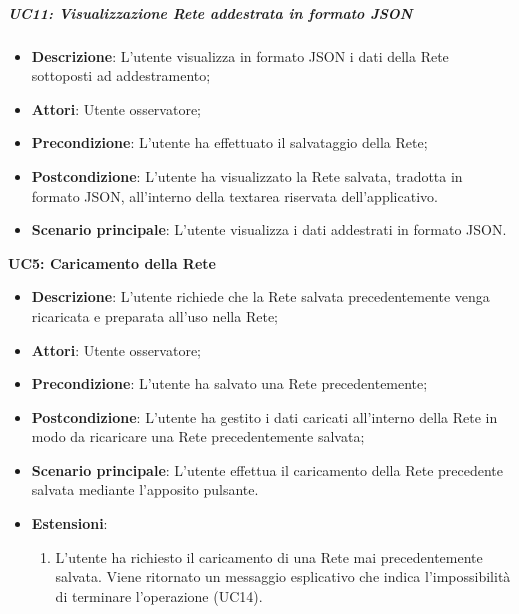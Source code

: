 \subparagraph{UC11: Visualizzazione Rete addestrata in formato JSON}\mbox{}
\label{UC11: Visualizzazione Rete addestrata in formato JSON}
\noindent
\begin{itemize}
\item \textbf{Descrizione}: L'utente visualizza in formato JSON i dati della Rete sottoposti ad addestramento;
\item \textbf{Attori}: Utente osservatore;
\item \textbf{Precondizione}: L'utente ha effettuato il salvataggio della Rete;
\item \textbf{Postcondizione}: L'utente ha visualizzato la Rete salvata, tradotta in formato JSON, all'interno della textarea riservata dell'applicativo.
\item \textbf{Scenario principale}: L'utente visualizza i dati addestrati in formato JSON.
\end{itemize}


\textbf{UC5: Caricamento della Rete}\mbox{}
\label{UC5: Caricamento della Rete}
\noindent
\begin{itemize}
\item \textbf{Descrizione}: L'utente richiede che la Rete salvata precedentemente venga ricaricata e preparata all'uso nella Rete;
\item \textbf{Attori}: Utente osservatore;
\item \textbf{Precondizione}: L'utente ha salvato una Rete precedentemente;
\item \textbf{Postcondizione}: L'utente ha gestito i dati caricati all'interno della Rete in modo da ricaricare una Rete precedentemente salvata;
\item \textbf{Scenario principale}: L'utente effettua il caricamento della Rete precedente salvata mediante l'apposito pulsante.
\item \textbf{Estensioni}:
\begin{enumerate}
\item L'utente ha richiesto il caricamento di una Rete mai precedentemente salvata. Viene ritornato un messaggio esplicativo che indica l'impossibilit\`a di terminare l'operazione (UC14).
\end{enumerate}
\end{itemize}

